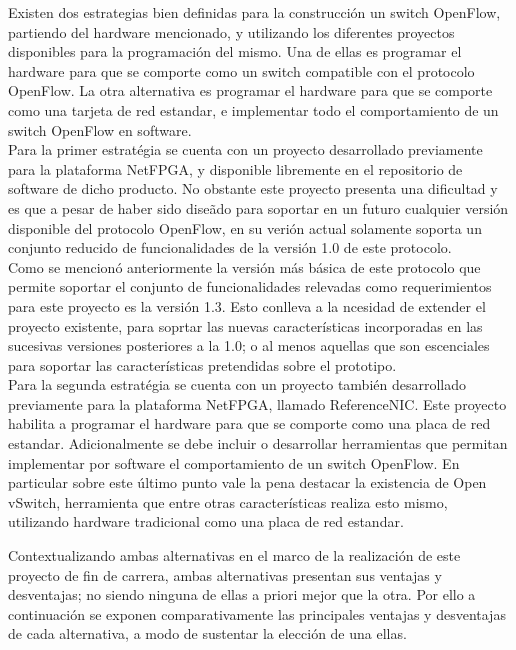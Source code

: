 Existen dos estrategias bien definidas para la construcci\'on un switch OpenFlow, partiendo del hardware mencionado, y utilizando los diferentes proyectos disponibles para la programaci\'on del mismo. Una de ellas es programar el hardware para que se comporte como un switch compatible con el protocolo OpenFlow. La otra alternativa es programar el hardware para que se comporte como una tarjeta de red estandar, e implementar todo el comportamiento de un switch OpenFlow en software.\\

Para la primer estrat\'egia se cuenta con un proyecto desarrollado previamente para la plataforma NetFPGA, y disponible libremente en el repositorio de software de dicho producto. No obstante este proyecto presenta una dificultad y es que a pesar de haber sido dise\~ado para soportar en un futuro cualquier versi\'on disponible del protocolo OpenFlow, en su veri\'on actual solamente soporta un conjunto reducido de funcionalidades de la versi\'on 1.0 de este protocolo. \\
Como se mencion\'o anteriormente la versi\'on m\'as b\'asica de este protocolo que permite soportar el conjunto de funcionalidades relevadas como requerimientos para este proyecto es la versi\'on 1.3. Esto conlleva a la ncesidad de extender el proyecto existente, para soprtar las nuevas caracter\'isticas incorporadas en las sucesivas versiones posteriores a la 1.0; o al menos aquellas que son escenciales para soportar las caracter\'isticas pretendidas sobre el prototipo.\\

Para la segunda estrat\'egia se cuenta con un proyecto tambi\'en desarrollado previamente para la plataforma NetFPGA, llamado ReferenceNIC. Este proyecto habilita a programar el hardware para que se comporte como una placa de red estandar. Adicionalmente se debe incluir o desarrollar herramientas que permitan implementar por software el comportamiento de un switch OpenFlow. En particular sobre este \'ultimo punto vale la pena destacar la existencia de Open vSwitch, herramienta que entre otras caracter\'isticas realiza esto mismo, utilizando hardware tradicional como una placa de red estandar.

Contextualizando ambas alternativas en el marco de la realizaci\'on de este proyecto de fin de carrera, ambas alternativas presentan sus ventajas y desventajas; no siendo ninguna de ellas a priori mejor que la otra. Por ello a continuaci\'on se exponen comparativamente las principales ventajas y desventajas de cada alternativa, a modo de sustentar la elecci\'on de una ellas. 

